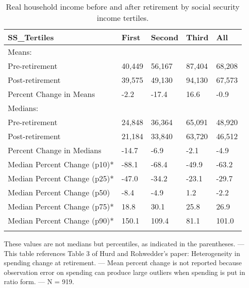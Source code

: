 \begin{table}[tbp] \centering
{}

\caption{Real household income before and after retirement by social security income tertiles.}
\begin{tabularx}{\textwidth}{lCCCC}

\toprule
{SS\_Tertiles}&{First}&{Second}&{Third}&{All} \tabularnewline
\midrule\addlinespace[1.5ex]
Means:&&&& \tabularnewline
\midrule Pre-retirement&40,449&56,167&87,404&68,208 \tabularnewline
Post-retirement&39,575&49,130&94,130&67,573 \tabularnewline
Percent Change in Means&-2.2&-17.4&16.6&-0.9 \tabularnewline
\midrule Medians:&&&& \tabularnewline
\midrule Pre-retirement&24,848&36,364&65,091&48,920 \tabularnewline
Post-retirement&21,184&33,840&63,720&46,512 \tabularnewline
Percent Change in Medians&-14.7&-6.9&-2.1&-4.9 \tabularnewline
Median Percent Change (p10)*&-88.1&-68.4&-49.9&-63.2 \tabularnewline
Median Percent Change (p25)*&-47.0&-34.2&-23.1&-29.7 \tabularnewline
Median Percent Change (p50)&-8.4&-4.9&1.2&-2.2 \tabularnewline
Median Percent Change (p75)*&18.8&30.1&25.8&26.9 \tabularnewline
Median Percent Change (p90)*&150.1&109.4&81.1&101.0 \tabularnewline
\bottomrule \addlinespace[1.5ex]

\end{tabularx}
\begin{flushleft}
\footnotesize *These values are not medians but percentiles, as indicated in the parentheses. \linebreak --- \linebreak This table references Table 3 of Hurd and Rohwedder's paper: Heterogeneity in spending change at retirement. \linebreak --- \linebreak Mean percent change is not reported because observation error on spending can produce large outliers when spending is put in ratio form. \linebreak --- \linebreak N = 919.
\end{flushleft}
\end{table}
